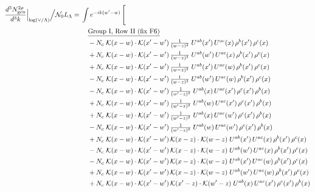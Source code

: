 \documentclass[10pt]{article}
\numberwithin{equation}{section}
\newcommand{\NO}{\mathcal N_0}
\newcommand{\LL}{L_\Lambda}
\begin{document}
\begin{align}
\frac{d^3N^{2\rho}_{\rm gen}}{d^3k}\Big|_{\log(\vee/\Lambda)}\Big/\NO\LL={}&\int e^{-ik(w'-w)}\,\Bigg[\notag\\
&\quad\underline{\text{Group I, Row II (fix F6)}}\notag\\
&\quad -N_c\;\mathcal{K}(x-w)\cdot\mathcal{K}(x'-w')\,\tfrac{1}{(w-z)^{2}}\;U^{ab}(x')\,U^{ac}(x)\,\rho^{b}(x')\,\rho^{c}(x)\notag\\
&\quad +N_c\;\mathcal{K}(x-w)\cdot\mathcal{K}(x'-w')\,\tfrac{1}{(w-z)^{2}}\;U^{ab}(w')\,U^{ac}(x)\,\rho^{b}(x')\,\rho^{c}(x)\notag\\
&\quad +N_c\;\mathcal{K}(x-w)\cdot\mathcal{K}(x'-w')\,\tfrac{1}{(w-z)^{2}}\;U^{ab}(x')\,U^{ac}(w)\,\rho^{b}(x')\,\rho^{c}(x)\notag\\
&\quad -N_c\;\mathcal{K}(x-w)\cdot\mathcal{K}(x'-w')\,\tfrac{1}{(w-z)^{2}}\;U^{ab}(w')\,U^{ac}(w)\,\rho^{b}(x')\,\rho^{c}(x)\notag\\
&\quad -N_c\;\mathcal{K}(x-w)\cdot\mathcal{K}(x'-w')\,\tfrac{1}{(w'-z)^{2}}\;U^{ab}(x)\,U^{ac}(x')\,\rho^{c}(x')\,\rho^{b}(x)\notag\\
&\quad +N_c\;\mathcal{K}(x-w)\cdot\mathcal{K}(x'-w')\,\tfrac{1}{(w'-z)^{2}}\;U^{ab}(w)\,U^{ac}(x')\,\rho^{c}(x')\,\rho^{b}(x)\notag\\
&\quad +N_c\;\mathcal{K}(x-w)\cdot\mathcal{K}(x'-w')\,\tfrac{1}{(w'-z)^{2}}\;U^{ab}(x)\,U^{ac}(w')\,\rho^{c}(x')\,\rho^{b}(x)\notag\\
&\quad -N_c\;\mathcal{K}(x-w)\cdot\mathcal{K}(x'-w')\,\tfrac{1}{(w'-z)^{2}}\;U^{ab}(w)\,U^{ac}(w')\,\rho^{c}(x')\,\rho^{b}(x)\notag\\
&\quad +N_c\;\mathcal{K}(x-w)\cdot\mathcal{K}(x'-w')\,\mathcal{K}(x-z)\cdot\mathcal{K}(w-z)\;U^{ab}(x')\,U^{ac}(x)\,\rho^{b}(x')\,\rho^{c}(x)\notag\\
&\quad -N_c\;\mathcal{K}(x-w)\cdot\mathcal{K}(x'-w')\,\mathcal{K}(x-z)\cdot\mathcal{K}(w-z)\;U^{ab}(w')\,U^{ac}(x)\,\rho^{b}(x')\,\rho^{c}(x)\notag\\
&\quad -N_c\;\mathcal{K}(x-w)\cdot\mathcal{K}(x'-w')\,\mathcal{K}(x-z)\cdot\mathcal{K}(w-z)\;U^{ab}(x')\,U^{ac}(w)\,\rho^{b}(x')\,\rho^{c}(x)\notag\\
&\quad +N_c\;\mathcal{K}(x-w)\cdot\mathcal{K}(x'-w')\,\mathcal{K}(x-z)\cdot\mathcal{K}(w-z)\;U^{ab}(w')\,U^{ac}(w)\,\rho^{b}(x')\,\rho^{c}(x)\notag\\
&\quad +N_c\;\mathcal{K}(x-w)\cdot\mathcal{K}(x'-w')\,\mathcal{K}(x'-z)\cdot\mathcal{K}(w'-z)\;U^{ab}(x)\,U^{ac}(x')\,\rho^{c}(x')\,\rho^{b}(x)\notag\\

\end{align}
\end{document}

